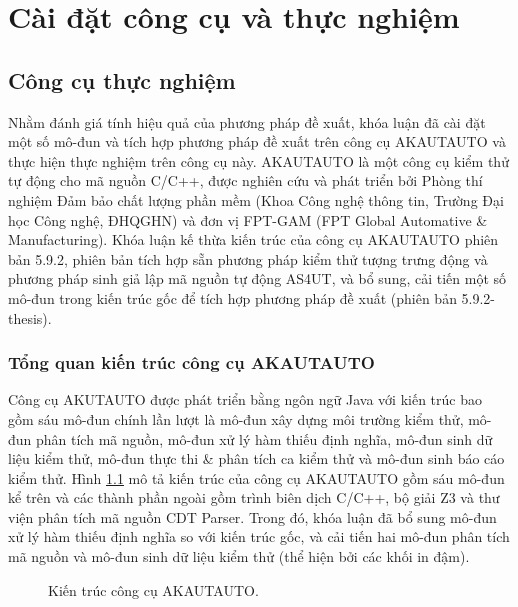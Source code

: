 \chapter{Cài đặt công cụ và thực nghiệm}\label{chap4}
\section{Công cụ thực nghiệm}
Nhằm đánh giá tính hiệu quả của phương pháp đề xuất, khóa luận đã cài đặt một số mô-đun và tích hợp phương pháp đề xuất trên công cụ AKAUTAUTO và thực hiện thực nghiệm trên công cụ này. AKAUTAUTO là một công cụ kiểm thử tự động cho mã nguồn C/C++, được nghiên cứu và phát triển bởi Phòng thí nghiệm Đảm bảo chất lượng phần mềm (Khoa Công nghệ thông tin, Trường Đại học Công nghệ, ĐHQGHN) và đơn vị FPT-GAM (FPT Global Automative \& Manufacturing). Khóa luận kế thừa kiến trúc của công cụ AKAUTAUTO phiên bản 5.9.2, phiên bản tích hợp sẵn phương pháp kiểm thử tượng trưng động và phương pháp sinh giả lập mã nguồn tự động AS4UT, và bổ sung, cải tiến một số mô-đun trong kiến trúc gốc để tích hợp phương pháp đề xuất (phiên bản 5.9.2-thesis).

\subsection{Tổng quan kiến trúc công cụ AKAUTAUTO}
Công cụ AKUTAUTO được phát triển bằng ngôn ngữ Java với kiến trúc bao gồm sáu mô-đun chính lần lượt là mô-đun xây dựng môi trường kiểm thử, mô-đun phân tích mã nguồn, mô-đun xử lý hàm thiếu định nghĩa, mô-đun sinh dữ liệu kiểm thử, mô-đun thực thi \& phân tích ca kiểm thử và mô-đun sinh báo cáo kiểm thử. Hình \ref{fig:architect} mô tả kiến trúc của công cụ AKAUTAUTO gồm sáu mô-đun kể trên và các thành phần ngoài gồm trình biên dịch C/C++, bộ giải Z3 và thư viện phân tích mã nguồn CDT Parser. Trong đó, khóa luận đã bổ sung mô-đun xử lý hàm thiếu định nghĩa so với kiến trúc gốc, và cải tiến hai mô-đun phân tích mã nguồn và mô-đun sinh dữ liệu kiểm thử (thể hiện bởi các khối in đậm).

\begin{figure}[t]
    \centering
    
    \caption{Kiến trúc công cụ AKAUTAUTO.}
    \label{fig:architect}
\end{figure}

